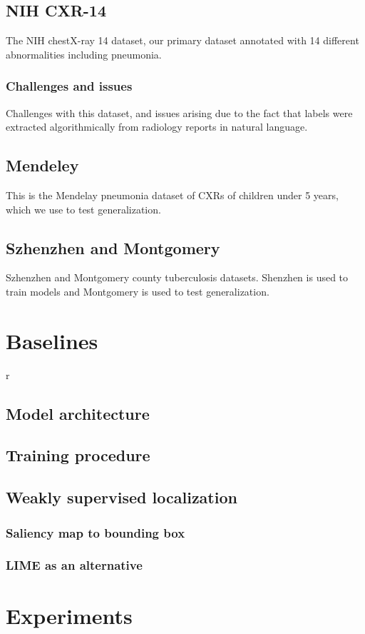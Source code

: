 \documentclass[11pt,twoside,a4paper]{report}
\begin{document}
    \section{NIH CXR-14}
    The NIH chestX-ray 14 dataset, our primary dataset annotated with 14 different abnormalities including
    pneumonia.
        \subsection{Challenges and issues}
        Challenges with this dataset, and issues arising due to the fact that labels were
        extracted algorithmically from radiology reports in natural language.
    \section{Mendeley}
    This is the Mendelay pneumonia dataset of CXRs of children under 5 years, which we use to test
    generalization.
    \section{Szhenzhen and Montgomery}
    Szhenzhen and Montgomery county tuberculosis datasets. Shenzhen is used to train models and
    Montgomery is used to test generalization.
\chapter{Baselines}r
    \section{Model architecture}
    \section{Training procedure}
    \section{Weakly supervised localization}
        \subsection{Saliency map to bounding box}
        \subsection{LIME as an alternative}
\chapter{Experiments\label{exp}}
\end{document}
